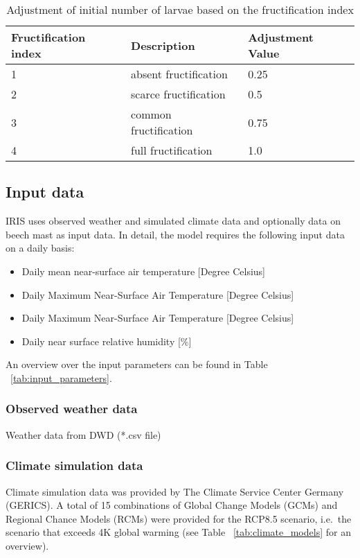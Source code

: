 \documentclass[a4paper, 11pt]{scrartcl}
\begin{document}
\begin{table}[h!]
\caption{Adjustment of initial number of larvae based on the fructification index}
\label{tab:fructification_adjustment}
\begin{tabularx}{\textwidth}{@{}lll@{}}
\toprule
\textbf{Fructification index} & \textbf{Description}    & \textbf{Adjustment Value}  	\\
\midrule
1				 	  		  & absent fructification 	& 	0.25	 			\\
2 				 	  		  & scarce fructification	&	0.5					\\
3 					  		  & common fructification	& 	0.75				\\
4					 		  & full fructification 	& 	1.0					\\
\bottomrule
\end{tabularx}
\end{table}

\subsection{Input data}
IRIS uses observed weather and simulated climate data and optionally data on beech mast as input data. In detail, the model requires the following input data on a daily basis:
\begin{itemize}
\item Daily mean near-surface air temperature [Degree Celsius]
\item Daily Maximum Near-Surface Air Temperature [Degree Celsius]
\item Daily Maximum Near-Surface Air Temperature [Degree Celsius]
\item Daily near surface relative humidity [\%]
\end{itemize}

An overview over the input parameters can be found in Table ~\ref{tab:input_parameters}.

\subsubsection{Observed weather data}
Weather data from DWD (*.csv file)

\subsubsection{Climate simulation data}
Climate simulation data was provided by The Climate Service Center Germany (GERICS). A total of 15 combinations of Global Change Models (GCMs) and Regional Chance Models (RCMs) were provided for the RCP8.5 scenario, i.e.\ the scenario that exceeds 4K global warming (see Table ~\ref{tab:climate_models} for an overview).
\end{document}
